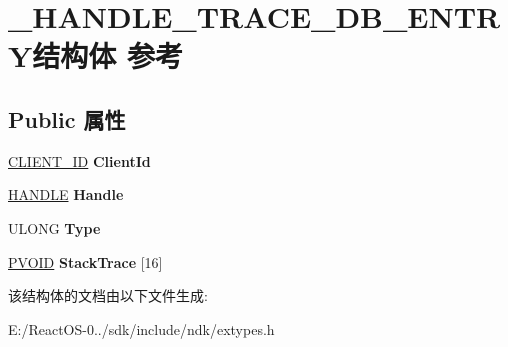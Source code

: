 \hypertarget{struct___h_a_n_d_l_e___t_r_a_c_e___d_b___e_n_t_r_y}{}\section{\+\_\+\+H\+A\+N\+D\+L\+E\+\_\+\+T\+R\+A\+C\+E\+\_\+\+D\+B\+\_\+\+E\+N\+T\+R\+Y结构体 参考}
\label{struct___h_a_n_d_l_e___t_r_a_c_e___d_b___e_n_t_r_y}
\subsection*{Public 属性}
\begin{DoxyCompactItemize}
\item 
\mbox{\label{struct___h_a_n_d_l_e___t_r_a_c_e___d_b___e_n_t_r_y_adc14fc08d562609f4675b48adffc9cc1}} 
\hyperlink{struct___c_l_i_e_n_t___i_d}{C\+L\+I\+E\+N\+T\+\_\+\+ID} {\bfseries Client\+Id}
\item 
\mbox{\label{struct___h_a_n_d_l_e___t_r_a_c_e___d_b___e_n_t_r_y_aa53176d753cba5dd2f604f606460c374}} 
\hyperlink{interfacevoid}{H\+A\+N\+D\+LE} {\bfseries Handle}
\item 
\mbox{\label{struct___h_a_n_d_l_e___t_r_a_c_e___d_b___e_n_t_r_y_a25017948ff0c48421ea75f787a04de49}} 
U\+L\+O\+NG {\bfseries Type}
\item 
\mbox{\label{struct___h_a_n_d_l_e___t_r_a_c_e___d_b___e_n_t_r_y_a61354456e4969e4eab5f7a19dd353cf1}} 
\hyperlink{interfacevoid}{P\+V\+O\+ID} {\bfseries Stack\+Trace} \mbox{[}16\mbox{]}
\end{DoxyCompactItemize}


该结构体的文档由以下文件生成\+:\begin{DoxyCompactItemize}
\item 
E\+:/\+React\+O\+S-\/0../sdk/include/ndk/extypes.\+h\end{DoxyCompactItemize}
